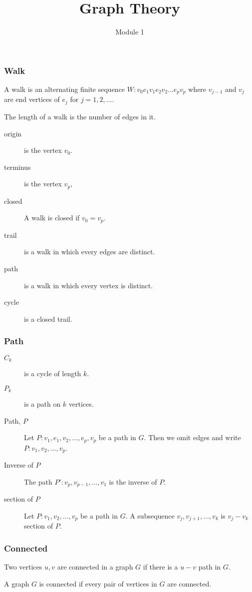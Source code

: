 \documentclass{beamer}
\title{Graph Theory}
\author{Module 1}
\institute{Section 5 : Paths and Connectedness}
\begin{document}
\begin{frame}
	\maketitle
\end{frame}

\begin{frame}
\frametitle{Walk}
\begin{definition}[walk]
	A walk is an alternating finite sequence $W : v_0e_1v_1e_2v_2\dots e_pv_p$ where $v_{j-1}$ and $v_j$ are end vertices of $e_j$ for $j = 1,2,\dots$.
\end{definition}
The length of a walk is the number of edges in it.
\begin{description}
	\item[origin] is the vertex $v_0$.
	\item[terminus] is the vertex $v_p$,
	\item[closed] A walk is closed if $v_0 = v_p$.
	\item[trail] is a walk in which every edges are distinct.
	\item[path] is a walk in which every vertex is distinct.
	\item[cycle] is a closed trail.
\end{description}
\end{frame}

\begin{frame}
\frametitle{Path}
\begin{description}
	\item[$C_k$] is a cycle of length $k$.
	\item[$P_k$] is a path on $k$ vertices.
	\item[Path, $P$] Let $P : v_1,e_1,v_2,\dots,e_p,v_p$ be a path in $G$. Then we omit edges and write $P : v_1,v_2,\dots,v_p$.
	\item[Inverse of $P$] The path $P' : v_p,v_{p-1},\dots,v_1$ is the inverse of $P$.
	\item[section of $P$] Let $P : v_1,v_2,\dots,v_p$ be a path in $G$.
	A subsequence $v_j,v_{j+1},\dots,v_k$ is $v_j-v_k$ section of $P$.
\end{description}
\end{frame}

\begin{frame}
\frametitle{Connected}
\begin{definition}
	Two vertices $u,v$ are connected in a graph $G$ if there is a $u-v$ path in $G$.
\end{definition}
\begin{definition}
	A graph $G$ is connected if every pair of vertices in $G$ are connected.
\end{definition}
\end{frame}
\end{document}
